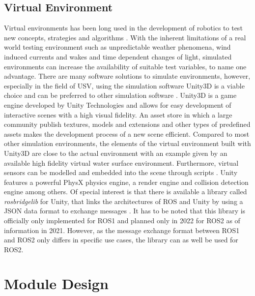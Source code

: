 \subsection{Virtual Environment} \label{virtuenv}
Virtual environments has been long used in the development of robotics to test new concepts, strategies and algorithms \cite{Gazebo}. With the inherent limitations of a real world testing environment such as unpredictable weather phenomena, wind induced currents and wakes and time dependent changes of light, simulated environments can increase the availability of suitable test variables, to name one advantage. There are many software solutions to simulate environments, however, especially in the field of \ac{USV}, using the simulation software Unity3D is a viable choice and can be preferred to other simulation software \cite{UnityUSV}. Unity3D is a game engine developed by Unity Technologies and allows for easy development of interactive scenes with a high visual fidelity. An asset store in which a large community  publish textures, models and extensions and other types of predefined assets makes the development process of a new scene efficient. Compared to most other simulation environments, the elements of the virtual environment built with Unity3D are close to the actual environment with an example given by an available high fidelity virtual water surface environment. Furthermore, virtual sensors can be modelled and embedded into the scene through scripts \cite{UnityUSV}. Unity features a powerful PhysX physics engine, a render engine and collision detection engine among others. Of special interest is that there is available a library called \textit{rosbridgelib} for Unity, that links the architectures of \ac{ROS} and Unity by using a \ac{JSON} data format to exchange messages \cite{ROStoUnity}. It has to be noted that this library is officially only implemented for ROS1 and planned only in 2022 for ROS2 as of information in 2021. However, as the message exchange format between ROS1 and ROS2 only differs in specific use cases, the library can as well be used for ROS2.

\section{Module Design}\label{ModuleDes}

